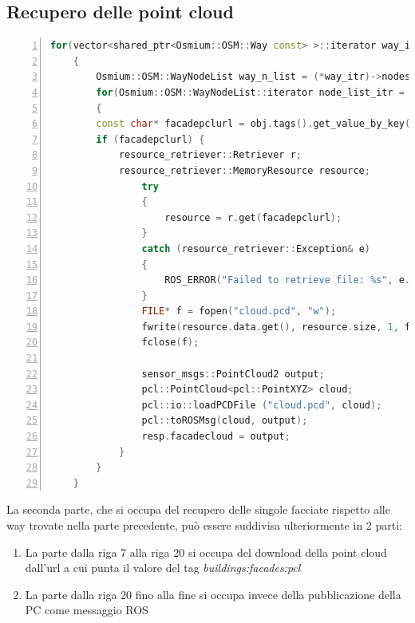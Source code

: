 \subsection{Recupero delle point cloud}
\begin{lstlisting}[caption = {Recupero e download delle pointcloud},numbers=left,captionpos=b, language = cpp]
 for(vector<shared_ptr<Osmium::OSM::Way const> >::iterator way_itr = way_vector.begin(); way_itr != way_vector.end(); way_itr++)
    {
        Osmium::OSM::WayNodeList way_n_list = (*way_itr)->nodes();
        for(Osmium::OSM::WayNodeList::iterator node_list_itr = way_n_list.begin(); node_list_itr != way_n_list.end() - 1; node_list_itr++ )
        {
        const char* facadepclurl = obj.tags().get_value_by_key("building:facade:pcl");
        if (facadepclurl) {
            resource_retriever::Retriever r;
            resource_retriever::MemoryResource resource;
                try
                {    
                    resource = r.get(facadepclurl); 
                }
                catch (resource_retriever::Exception& e)
                {
                    ROS_ERROR("Failed to retrieve file: %s", e.what());
                }
                FILE* f = fopen("cloud.pcd", "w");
                fwrite(resource.data.get(), resource.size, 1, f);
                fclose(f);
                
                sensor_msgs::PointCloud2 output;
                pcl::PointCloud<pcl::PointXYZ> cloud;
                pcl::io::loadPCDFile ("cloud.pcd", cloud);
                pcl::toROSMsg(cloud, output);
                resp.facadecloud = output;
            }
        }
    }
\end{lstlisting}{}

La seconda parte, che si occupa del recupero delle singole facciate rispetto alle way trovate nella parte precedente, può essere suddivisa ulteriormente in 2 parti:
\begin{enumerate}
    \item La parte dalla riga 7 alla riga 20 si occupa del download della point cloud dall'url a cui punta il valore del tag \textit{buildings:facades:pcl}
    \item La parte dalla riga 20 fino alla fine si occupa invece della pubblicazione della PC come messaggio ROS
\end{enumerate}

